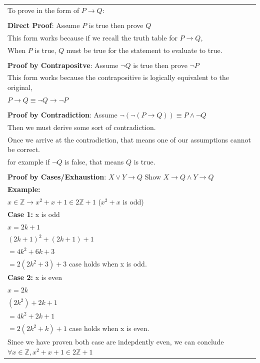 \documentclass{article}
\begin{document}
\begin{tabular}{l}
{\Large To prove in the form of $P \rightarrow Q$}:\\

 \\

\textbf{Direct Proof}: Assume $P$ is true then prove $Q$\\
\hline
This form works because if we recall the truth table for $P \rightarrow Q$,\\
When $P$ is true, $Q$ must be true for the statement to evaluate to true.\\

 \\

\textbf{Proof by Contrapositve}: Assume $\neg Q$ is true then prove $\neg P$\\
\hline
This form works because the contrapositive is logically equivalent to the original,\\
$P \rightarrow Q \equiv \neg Q \rightarrow \neg P$\\

 \\

\textbf{Proof by Contradiction}: Assume $\neg(\neg(P \rightarrow Q)) \equiv P \land \neg Q$\\
\hline
Then we must derive some sort of contradiction.\\
Once we arrive at the contradiction, that means one of our assumptions cannot be correct.\\
for example if $\neg Q$ is false, that means $Q$ is true.\\

 \\

\textbf{Proof by Cases/Exhaustion}: $X \lor Y \rightarrow Q$ Show $X \rightarrow Q \land Y \rightarrow Q$\\
\textbf{Example:}\\
$x \in \mathbb Z \rightarrow x^2 + x + 1\in 2 \mathbb Z + 1$
($x^2 + x$ is odd)\\
\hline
\textbf{Case 1:} x is odd\\
$x = 2k + 1$\\
$(2k + 1)^2 + (2k + 1) + 1$\\
$= 4k^2 + 6k + 3$\\
$= 2(2k^2 + 3) + 3$ case holds when x is odd. \\
\hline
\textbf{Case 2:} x is even\\
$x = 2k$\\
$(2k^2) + 2k + 1$\\
$= 4k^2 + 2k + 1$\\
$= 2(2k^2 + k) + 1$ case holds when x is even.\\
Since we have proven both case are indepdently even, we can conclude $\forall x \in \mathbb Z, x^2 + x + 1 \in 2\mathbb Z +
1$
\end{tabular}
\end{document}
